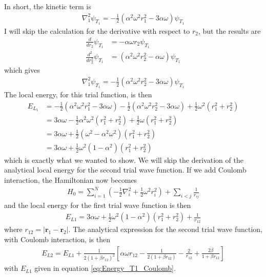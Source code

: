 \documentclass[12pt]{article}
\begin{document}
In short, the kinetic term is
\begin{align}
\nabla_1^2 \psi_{T_1} =-\frac{1}{2}(\alpha^2\omega^2r_1^2 -3 \alpha \omega)\psi_{T_1}
\label{eq:Kinetic_psi1}
\end{align}
I will skip the calculation for the derivative with respect to $r_2$, but the results are
\begin{align*}
\frac{d}{dr_2}\psi_{T_1} &=  -\alpha \omega r_2 \psi_{T_1} \\
\frac{d^2}{dr_2^2}\psi_{T_1} &= (\alpha^2 \omega^2 r_2^2 - \alpha \omega)\psi_{T_1}
\end{align*}
which gives
\begin{align*}
\nabla_1^2 \psi_{T_1} =-\frac{1}{2}(\alpha^2\omega^2r_2^2 -3 \alpha \omega)\psi_{T_1}
\end{align*}
The local energy, for this trial function, is then
\begin{align}
E_{L_1} &= -\frac{1}{2} (\alpha^2 \omega^2 r_1^2 - 3\alpha \omega)  - \frac{1}{2} (\alpha^2 \omega^2 r_2^2 - 3\alpha \omega) + \frac{1}{2}\omega^2(r_1^2 + r_2^2) \nonumber \\
&= 3 \alpha \omega  - \frac{1}{2}\alpha^2 \omega^2 (r_1^2 + r_2^2) + \frac{1}{2}\omega(r_1^2 + r_2^2) \nonumber \\
&= 3\alpha \omega + \frac{1}{2}(\omega^2 - \alpha^2 \omega^2)(r_1^2 + r_2^2) \nonumber \\
&= 3 \alpha \omega +  \frac{1}{2}\omega^2(1-\alpha^2)(r_1^2 + r_2^2)
\label{eq:Energy_T1}
\end{align}
which is exactly what we wanted to show. We will skip the derivation of the analytical local energy for the second trial wave function. If we add Coulomb interaction, the Hamiltonian now becomes
\begin{align*}
H_0 = \displaystyle \sum_{i=1}^N\left(-\frac{1}{2}\nabla_i^2 + \frac{1}{2}\omega^2r_i^2 \right) + \sum_{i<j}\frac{1}{r_{ij}}
\end{align*}
and the local energy for the first trial wave function is then
\begin{align}
E_{L1} = 3 \alpha \omega +  \frac{1}{2}\omega^2(1-\alpha^2)(r_1^2 + r_2^2) + \frac{1}{r_{12}}
\label{eq:Energy_T1_Coulomb}
\end{align}
where $r_{12}= |\mathbf{r}_1 - \mathbf{r}_2|$. The analytical expression for the second trial wave function, with Coulomb interaction, is then
\begin{align}
E_{L2} = E_{L1} + \frac{1}{2(1+\beta r_{12})^2}\left[\alpha \omega r_{12} - \frac{1}{2(1+\beta r_{12})} - \frac{2}{r_{12}} + \frac{2\beta}{1+\beta r_{12}} \right]
\label{eq:Energy_T2_Coulomb}
\end{align}
with $E_{L1}$ given in equation \ref{eq:Energy_T1_Coulomb}.
\end{document}
